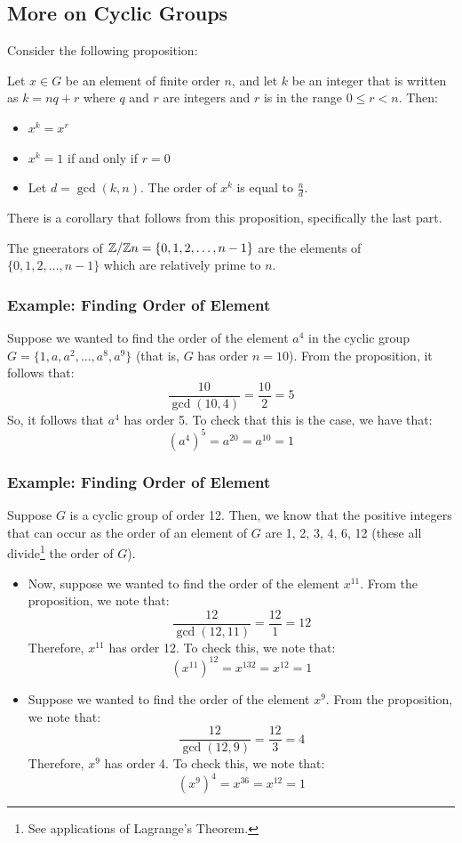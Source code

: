 \documentclass[letterpaper]{article}
\begin{document}
\subsection{More on Cyclic Groups}
Consider the following proposition: 
\begin{mdframed}
    \begin{proposition}
        Let $x \in G$ be an element of finite order $n$, and let $k$ be an integer that is written as $k = nq + r$ where $q$ and $r$ are integers and $r$ is in the range $0 \leq r < n$. Then: 
        \begin{itemize}
            \item $x^k = x^r$ 
            \item $x^k = 1$ if and only if $r = 0$
            \item Let $d = \gcd(k, n)$. The order of $x^k$ is equal to $\frac{n}{d}$. 
        \end{itemize} 
    \end{proposition}
\end{mdframed}

There is a corollary that follows from this proposition, specifically the last part. 
\begin{corollary}{}{}
    The gneerators of $\mathbb{Z} / \mathbb{Z} n = \{0, 1, 2, \dots, n - 1\}$ are the elements of $\{0, 1, 2, \dots, n - 1\}$ which are relatively prime to $n$. 
\end{corollary}

\subsubsection{Example: Finding Order of Element}
Suppose we wanted to find the order of the element $a^{4}$ in the cyclic group $G = \{1, a, a^2, \dots, a^8, a^9\}$ (that is, $G$ has order $n = 10$). From the proposition, it follows that: 
\[\frac{10}{\gcd(10, 4)} = \frac{10}{2} = 5\]
So, it follows that $a^4$ has order 5. To check that this is the case, we have that: 
\[(a^4)^{5} = a^{20} = a^{10} = 1\]

\subsubsection{Example: Finding Order of Element}
Suppose $G$ is a cyclic group of order 12. Then, we know that the positive integers that can occur as the order of an element of $G$ are 1, 2, 3, 4, 6, 12 (these all divide\footnote{See applications of Lagrange's Theorem.} the order of $G$).
\begin{itemize}
    \item Now, suppose we wanted to find the order of the element $x^{11}$. From the proposition, we note that: 
    \[\frac{12}{\gcd(12, 11)} = \frac{12}{1} = 12\]
    Therefore, $x^{11}$ has order 12. To check this, we note that: 
    \[(x^{11})^{12} = x^{132} = x^{12} = 1\]

    \item Suppose we wanted to find the order of the element $x^{9}$. From the proposition, we note that: 
    \[\frac{12}{\gcd(12, 9)} = \frac{12}{3} = 4\]
    Therefore, $x^{9}$ has order 4. To check this, we note that: 
    \[(x^9)^4 = x^{36} = x^{12} = 1\]
\end{itemize}
\end{document}
